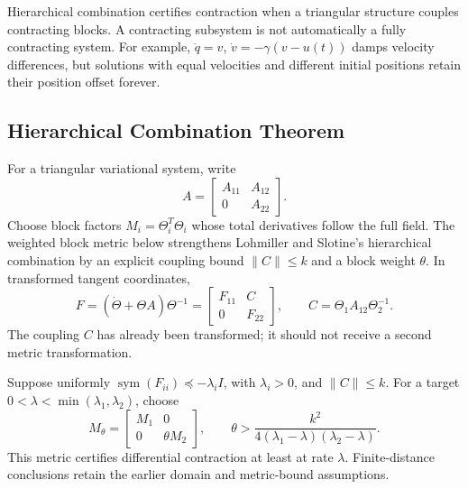 Hierarchical combination certifies contraction when a triangular structure couples contracting blocks. A contracting subsystem is not automatically a fully contracting system. For example, $\dot q=v$, $\dot v=-\gamma(v-u(t))$ damps velocity differences, but solutions with equal velocities and different initial positions retain their position offset forever.

\subsection{Hierarchical Combination Theorem}

For a triangular variational system, write
\begin{equation}
A=\begin{bmatrix}A_{11}&A_{12}\\0&A_{22}\end{bmatrix}.
\label{eq:ch4:block-jacobian}
\end{equation}
Choose block factors $M_i=\Theta_i^T\Theta_i$ whose total derivatives follow the full field. The weighted block metric below strengthens Lohmiller and Slotine's hierarchical combination \cite[Sec.~3.8.3]{LohmillerSlotine1998} by an explicit coupling bound $\|C\|\leq k$ and a block weight $\theta$. In transformed tangent coordinates,
\begin{equation}
F=(\dot\Theta+\Theta A)\Theta^{-1}
=\begin{bmatrix}F_{11}&C\\0&F_{22}\end{bmatrix},\qquad
C=\Theta_1A_{12}\Theta_2^{-1}.
\label{eq:ch4:cascade-jacobian}
\end{equation}
The coupling $C$ has already been transformed; it should not receive a second metric transformation.

\begin{theorem}
\label{thm:ch4:cascade}
Suppose uniformly $\operatorname{sym}(F_{ii})\preceq-\lambda_iI$, with $\lambda_i>0$, and $\|C\|\leq k$. For a target $0<\lambda<\min(\lambda_1,\lambda_2)$, choose
\begin{equation}
M_\theta=\begin{bmatrix}M_1&0\\0&\theta M_2\end{bmatrix},\qquad
\theta>\frac{k^2}{4(\lambda_1-\lambda)(\lambda_2-\lambda)}.
\label{eq:ch4:block-metric}
\end{equation}
This metric certifies differential contraction at least at rate $\lambda$. Finite-distance conclusions retain the earlier domain and metric-bound assumptions.
\end{theorem}

